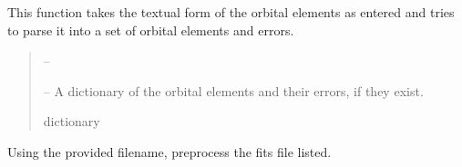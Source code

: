 \documentclass[letterpaper,11pt,english]{sphinxmanual}
\begin{document}
\begin{savenotes}
\begin{fulllineitems}
\begin{savenotes}
\begin{fulllineitems}
\end{fulllineitems}\end{savenotes}


\begin{savenotes}\begin{fulllineitems}
\label{\detokenize{code/opihiexarata.gui.manual:opihiexarata.gui.manual.OpihiManualWindow._parse_custom_orbital_elements}}
\pysigstartsignatures
{}
\pysigstopsignatures
\sphinxAtStartPar
This function takes the textual form of the orbital elements as
entered and tries to parse it into a set of orbital elements and errors.
\begin{quote}\begin{description}
\sphinxAtStartPar
{} – 

\sphinxAtStartPar
{} – A dictionary of the orbital elements and their errors, if they
exist.

\sphinxAtStartPar
dictionary

\end{description}\end{quote}

\end{fulllineitems}\end{savenotes}


\begin{savenotes}\begin{fulllineitems}
\label{\detokenize{code/opihiexarata.gui.manual:opihiexarata.gui.manual.OpihiManualWindow._preprocess_fits_file}}
\pysigstartsignatures
{}
\pysigstopsignatures
\sphinxAtStartPar
Using the provided filename, preprocess the fits file listed.


\end{fulllineitems}
\end{savenotes}
\end{fulllineitems}
\end{savenotes}
\end{document}
